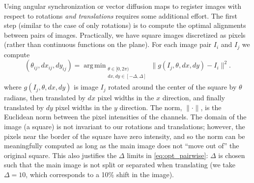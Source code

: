 \documentclass{pnastwo}
\DeclareMathOperator*{\argmin}{arg\,min}
\begin{document}
\begin{article}
Using angular synchronization or vector diffusion maps to register images with respect to rotations {\it and translations} requires some additional effort.
%
%
%
The first step (similar to the case of only rotations) is to compute the optimal alignments between pairs of images.
%
Practically, we have square images discretized as pixels (rather than continuous functions on the plane).
%
For each image pair $I_i$ and $I_j$ we compute
\begin{equation}\label{eq:opt_pairwise}
(\theta_{ij}, dx_{ij}, dy_{ij}) = \argmin_{
\begin{matrix}
\theta \in [0, 2\pi) \\
dx, dy \in [-\Delta, \Delta]\\
\end{matrix}
} \|g(I_j, \theta, dx, dy) - I_i \|^2.
\end{equation}
where $g(I_j, \theta, dx, dy)$ is image $I_j$ rotated around the center of the square by $\theta$ radians, then translated by $dx$ pixel widths in the $x$ direction, and finally translated by $dy$ pixel widths in the $y$ direction.
%
The norm, $\| \cdot \|$, is the Euclidean norm between the pixel intensities of the channels. 
%
The domain of the image (a square) is not invariant to our rotations and translations; however, the pixels near the border of the square have zero intensity, and so the norm can be meaningfully computed as long as the main image does not ``move out of'' the original square.
%
%
This also justifies the $\Delta$ limits in \eqref{eq:opt_pairwise}: $\Delta$ is chosen such that the main image is not split or separated when translating (we take $\Delta=10$, which corresponds to a 10\% shift in the image). 

\end{article}
\end{document}
